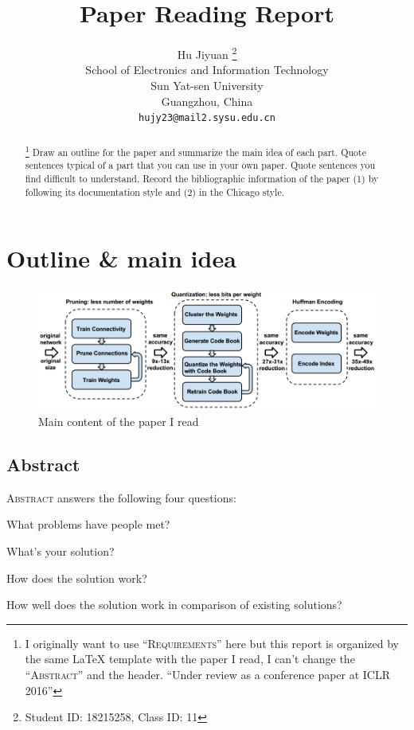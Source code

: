 \documentclass{article} %
\title{Paper Reading Report}
\author{Hu Jiyuan \thanks{ Student ID: 18215258, Class ID: 11} \\
School of Electronics and Information Technology\\
Sun Yat-sen University\\
Guangzhou, China \\
\texttt{hujy23@mail2.sysu.edu.cn} \\
}
\begin{document}
\maketitle

\begin{abstract} 
\footnote{I originally want to use ``\textsc{Requirements}'' here 
but this report is organized by the same \LaTeX{} template with the 
paper I read, I can't change the ``\textsc{Abstract}'' and the header.
``Under review as a conference paper at ICLR 2016''} 
Draw an outline for the paper and summarize the main idea of each part.
Quote sentences typical of a part that you can use in your own paper.
Quote sentences you find difficult to understand.
Record the bibliographic information of the paper 
(1) by following its documentation style and 
(2) in the Chicago style.
\end{abstract}

\section{Outline \& main idea}
\begin{figure}[h]
\begin{center}
\includegraphics[width=\textwidth]{graphics/part1-overview.png} 
\end{center}
\caption{Main content of the paper I read}
\end{figure}

\subsection{Abstract} 

\textsc{Abstract} answers the following four questions: 
    \par What problems have people met?
    \par What's your solution?
    \par How does the solution work?
    \par How well does the solution work in comparison of existing solutions?
\end{document}
